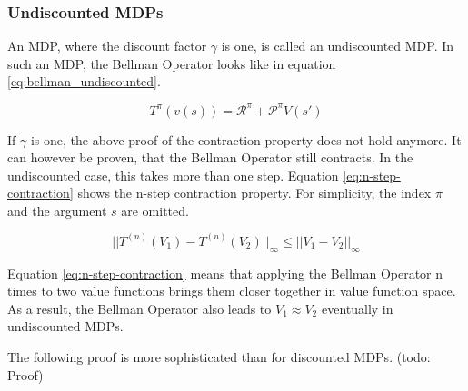 \subsubsection{Undiscounted MDPs}

An MDP, where the discount factor $\gamma$ is one, is called an undiscounted MDP. In such an MDP, the Bellman Operator looks like in equation \ref{eq:bellman_undiscounted}.

\begin{equation}
T^\pi(v(s))=\mathcal{R}^\pi + \mathcal{P}^\pi V(s')
\label{eq:bellman_undiscounted}
\end{equation}

If $\gamma$ is one, the above proof of the contraction property does not hold anymore. It can however be proven, that the Bellman Operator still contracts. In the undiscounted case, this takes more than one step. Equation \ref{eq:n-step-contraction} shows the n-step contraction property. For simplicity, the index $\pi$ and the argument $s$ are omitted.

\begin{equation}
||T^{(n)}(V_1)-T^{(n)}(V_2)||_\infty \leq ||V_1-V_2||_\infty
\label{eq:n-step-contraction}
\end{equation}

Equation \ref{eq:n-step-contraction} means that applying the Bellman Operator n times to two value functions brings them closer together in value function space. As a result, the Bellman Operator also leads to $V_1 \approx V_2$ eventually in undiscounted MDPs.

The following proof is more sophisticated than for discounted MDPs. 
(todo: Proof)

